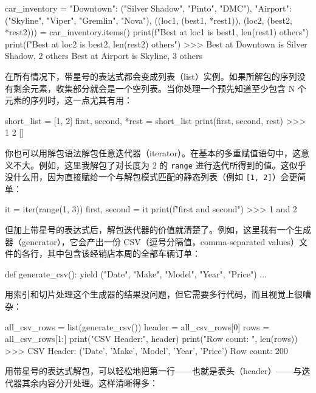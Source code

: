 \begin{codebox}[python]
car_inventory = {
    "Downtown": ("Silver Shadow", "Pinto", "DMC"),
    "Airport": ("Skyline", "Viper", "Gremlin", "Nova"),
}
((loc1, (best1, *rest1)),
 (loc2, (best2, *rest2))) = car_inventory.items()
print(f"Best at {loc1} is {best1}, {len(rest1)} others")
print(f"Best at {loc2} is {best2}, {len(rest2)} others")
>>>
Best at Downtown is Silver Shadow, 2 others
Best at Airport is Skyline, 3 others
\end{codebox}

在所有情况下，带星号的表达式都会变成列表（list）实例。如果所解包的序列没有剩余元素，收集部分就会是一个空列表。当你处理一个预先知道至少包含 N 个元素的序列时，这一点尤其有用：

\begin{codebox}[python]
short_list = [1, 2]
first, second, *rest = short_list
print(first, second, rest)
>>>
1 2 []
\end{codebox}

你也可以用解包语法解包任意迭代器（iterator）。在基本的多重赋值语句中，这意义不大。例如，这里我解包了对长度为 2 的 \texttt{range} 进行迭代所得到的值。这似乎没什么用，因为直接赋给一个与解包模式匹配的静态列表（例如 \texttt{[1, 2]}）会更简单：

\begin{codebox}[python]
it = iter(range(1, 3))
first, second = it
print(f"{first} and {second}")
>>>
1 and 2
\end{codebox}

但加上带星号的表达式后，解包迭代器的价值就清楚了。例如，这里我有一个生成器（generator），它会产出一份 CSV（逗号分隔值，comma-separated values）文件的各行，其中包含该经销店本周的全部车辆订单：

\begin{codebox}[python]
def generate_csv():
    yield ("Date", "Make", "Model", "Year", "Price")
    ...
\end{codebox}

用索引和切片处理这个生成器的结果没问题，但它需要多行代码，而且视觉上很嘈杂：

\begin{codebox}[python]
all_csv_rows = list(generate_csv())
header = all_csv_rows[0]
rows = all_csv_rows[1:]
print("CSV Header:", header)
print("Row count: ", len(rows))
>>>
CSV Header: ('Date', 'Make', 'Model', 'Year', 'Price')
Row count:  200
\end{codebox}

用带星号的表达式解包，可以轻松地把第一行——也就是表头（header）——与迭代器其余内容分开处理。这样清晰得多：

